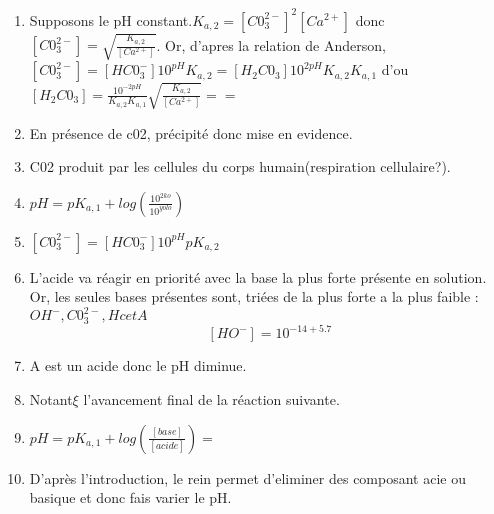 \documentclass[a4paper, 10pt]{article}
\def \hhco {H_{2}C0_{3} }
\def \hco {HC0_{3}^{-} }
\def \co {C0_{3}^{2-} }
\begin{document}
\begin{enumerate}[label=\arabic*)]
	\item Supposons le pH constant.\( K_{a,2}=[\co]^{2}[Ca^{2+}] \) donc \( [\co] = \sqrt{\frac{K_{a,2}}{[Ca^{2+}]}} \).
		Or, d'apres la relation de Anderson, \( [\co]=[\hco]10^{pH}K_{a,2}=[\hhco]10^{2pH}K_{a,2}K_{a,1} \) 
		d'ou \( [\hhco]=\frac{10^{-2pH}}{K_{a,2}K_{a,1}}\sqrt{\frac{K_{a,2}}{[Ca^{2+}]}}== \)
	\item En présence de c02, précipité donc mise en evidence. 
	\item C02 produit par les cellules du corps humain(respiration cellulaire?). 
	\item \(pH = pK_{a,1} + log(\frac{10^{2ko}}{10^{yolo}}) \)
	\item \([\co] = [\hco]10^{pH}pK_{a,2}\)
	\item L'acide va réagir en priorité avec la base la plus forte présente en solution. Or, les seules bases présentes sont, triées de la plus forte a la plus faible :
	\(OH^{-}, \co, Hc et A\) \[[HO^{-}]=10^{-14 +5.7} \]

	\item A est un acide donc le pH diminue.       
	\item Notant\( \xi \) l'avancement final de la réaction suivante.
	\item \( pH = pK_{a,1} + log(\frac{[base]}{[acide]})= \)
	\item D'après l'introduction, le rein permet d'eliminer des composant acie ou basique et donc fais varier le pH. 
\end{enumerate}
\end{document}
